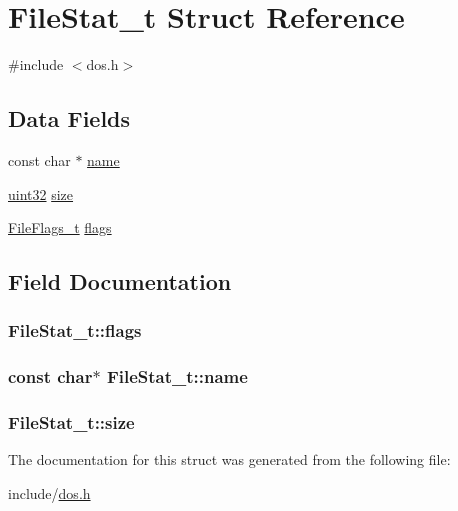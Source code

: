 \hypertarget{structFileStat__t}{\section{File\+Stat\+\_\+t Struct Reference}
\label{structFileStat__t}
}


{\ttfamily \#include $<$dos.\+h$>$}

\subsection*{Data Fields}
\begin{DoxyCompactItemize}
\item 
const char $\ast$ \hyperlink{structFileStat__t_a884a40dc671aad6f0966a7dac061d56f}{name}
\item 
\hyperlink{type_8h_acbd4acd0d29e2d6c43104827f77d9cd2}{uint32} \hyperlink{structFileStat__t_af6cadf85ce23a6bc64017ecaf0a32cd5}{size}
\item 
\hyperlink{dos_8h_ae1de7af501747e3d8d35ef545a2b7663}{File\+Flags\+\_\+t} \hyperlink{structFileStat__t_ada35b57e0f82078b5dc41439fc6dbf32}{flags}
\end{DoxyCompactItemize}


\subsection{Field Documentation}
\hypertarget{structFileStat__t_ada35b57e0f82078b5dc41439fc6dbf32}{
\subsubsection[{flags}]{ File\+Stat\+\_\+t\+::flags}}\label{structFileStat__t_ada35b57e0f82078b5dc41439fc6dbf32}
\hypertarget{structFileStat__t_a884a40dc671aad6f0966a7dac061d56f}{
\subsubsection[{name}]{\setlength{\rightskip}{0pt plus 5cm}const char$\ast$ File\+Stat\+\_\+t\+::name}}\label{structFileStat__t_a884a40dc671aad6f0966a7dac061d56f}
\hypertarget{structFileStat__t_af6cadf85ce23a6bc64017ecaf0a32cd5}{
\subsubsection[{size}]{ File\+Stat\+\_\+t\+::size}}\label{structFileStat__t_af6cadf85ce23a6bc64017ecaf0a32cd5}


The documentation for this struct was generated from the following file\+:\begin{DoxyCompactItemize}
\item 
include/\hyperlink{dos_8h}{dos.\+h}\end{DoxyCompactItemize}

